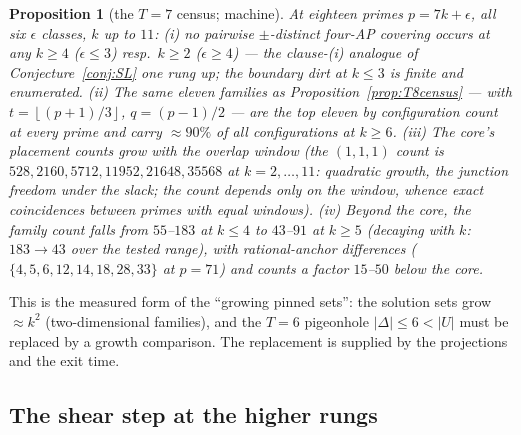 \documentclass[11pt,a4paper]{article}
\numberwithin{equation}{section}
\theoremstyle{plain}
\theoremstyle{plain}
\newtheorem{proposition}[theorem]{Proposition}
\theoremstyle{definition}
\theoremstyle{remark}
\newcommand{\floor}[1]{\left\lfloor #1 \right\rfloor}
\begin{document}
\begin{proposition}[the $T=7$ census; machine]\label{prop:T7census}
At eighteen primes $p=7k+\epsilon$, all six $\epsilon$ classes, $k$ up
to $11$: (i) \emph{no pairwise $\pm$-distinct four-AP covering occurs}
at any $k\ge4$ ($\epsilon\le3$) resp.\ $k\ge2$ ($\epsilon\ge4$) --- the
clause-(i) analogue of Conjecture~\ref{conj:SL} one rung up; the
boundary dirt at $k\le3$ is finite and enumerated. (ii) The same eleven
families as Proposition~\ref{prop:T8census} --- with
$t=\floor{(p+1)/3}$, $q=(p-1)/2$ --- are the top eleven by
configuration count at every prime and carry $\approx90\%$ of all
configurations at $k\ge6$. (iii) The core's placement counts grow with
the overlap window (the $(1,1,1)$ count is
$528,2160,5712,11952,21648,35568$ at $k=2,\dots,11$: quadratic growth,
the junction freedom under the slack; the count depends only on the
window, whence exact coincidences between primes with equal windows).
(iv) Beyond the core, the family count falls from $55$--$183$ at
$k\le4$ to $43$--$91$ at $k\ge5$ (decaying with $k$: $183\to43$ over
the tested range), with rational-anchor differences
($\{4,5,6,12,14,18,28,33\}$ at $p=71$) and counts a factor $15$--$50$
below the core.
\end{proposition}

This is the measured form of the ``growing pinned sets'': the solution
sets grow $\approx k^2$ (two-dimensional families), and the $T=6$
pigeonhole $|\Delta|\le6<|U|$ must be replaced by a growth comparison.
The replacement is supplied by the projections and the exit time.

\subsection{The shear step at the higher rungs}
\end{document}
